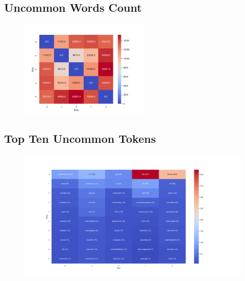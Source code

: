 \documentclass[11pt]{article}
\begin{document}
\subsection{Uncommon Words Count}
\begin{center}


\CountUCWTable
\begin{figure}[h!]
  \includegraphics[width=0.55\textwidth]{figs/count_cuc_words/uc_w.png}
\end{figure}
\end{center}


\subsection{Top Ten Uncommon Tokens}
\begin{center}


\resizebox{\columnwidth}{!}
{
\TTUCTTable
}
\begin{figure}[h!]
  \includegraphics[width=1.1\textwidth]{figs/top_ten_uc_words/token.png}
\end{figure}
\end{center}
\end{document}
